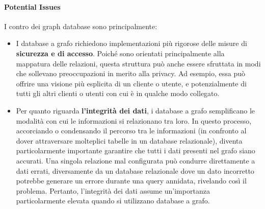 \paragraph{Potential Issues} I contro dei graph database sono principalmente:
\begin{itemize}
    \item I database a grafo richiedono implementazioni più rigorose delle misure di \textbf{sicurezza e di accesso}. Poiché sono orientati principalmente alla mappatura delle relazioni, questa struttura può anche essere sfruttata in modi che sollevano preoccupazioni in merito alla privacy. Ad esempio, essa può offrire una visione più esplicita di un cliente o utente, e potenzialmente di tutti gli altri clienti o utenti con cui è in qualche modo collegato.
    \item Per quanto riguarda \textbf{l'integrità dei dati}, i database a grafo semplificano le modalità con cui le informazioni si relazionano tra loro. In questo processo, accorciando o condensando il percorso tra le informazioni (in confronto al dover attraversare molteplici tabelle in un database relazionale), diventa particolarmente importante garantire che tutti i dati presenti nel grafo siano accurati. Una singola relazione mal configurata può condurre direttamente a dati errati, diversamente da un database relazionale dove un dato incorretto potrebbe generare un errore durante una query annidata, rivelando così il problema. Pertanto, l'integrità dei dati assume un'importanza particolarmente elevata quando si utilizzano database a grafo.
\end{itemize}

